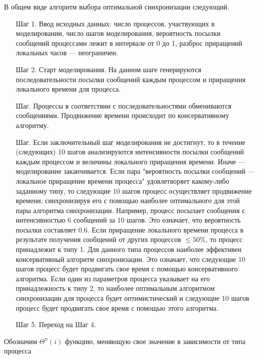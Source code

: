 В общем виде алгоритм выбора оптимальной синхронизации следующий.
\begin{itemize}


\item[Шаг 1.] Ввод исходных данных: число процессов, участвующих в моделировании, число шагов моделирования, вероятность посылки сообщений процессами лежит в интервале от 0 до 1, разброс приращений локальных часов --- неограничен.

\item[Шаг 2.] Старт моделирования. На данном шаге генерируются последовательности посылки сообщений каждым процессом и приращения локального времени для процесса. 

\item[Шаг\;3.] Процессы в соответствии с последовательностями обмениваются сообщениями. Продвижение времени происходит по консервативному алгоритму.

\item[Шаг\;4.] Если заключительный шаг моделирования не достигнут, то в течение (следующих) 10 шагов анализируются интенсивности посылки сообщений каждым процессом и величины локального приращения времени. Иначе --- моделирование заканчивается. Если пара "вероятность посылки сообщений --- локальное приращение времени процесса" удовлетворяет какому-либо заданному типу, то следующие 10 шагов процесс осуществляет продвижение времени, синхронизируя его с помощью наиболее оптимального для этой пары алгоритма синхронизации. Например, процесс посылает сообщения с интенсивностью 6 сообщений за 10 шагов. Это означает, что вероятность посылки составляет $0.6$. Если приращение локального времени процесса в результате получения сообщений от других процессов $\leqslant 50\%$, то процесс принадлежит к типу 1. Для данного типа процессов наиболее эффективен консервативный алгоритм синхронизации. Это означает, что следующие 10 шагов процесс будет продвигать свое время с помощью консервативного алгоритма. Если один из параметров процесса указывает на его принадлежность к типу 2, то наиболее оптимальным алгоритмом синхронизации для процесса будет оптимистический и следующие 10 шагов процесс будет продвигать свое время с помощью этого алгоритма.

\item[Шаг 5.] Переход на Шаг 4.

\end{itemize}

Обозначим $\Theta^n(i)$ функцию, меняющую свое значение в зависимости от типа процесса

